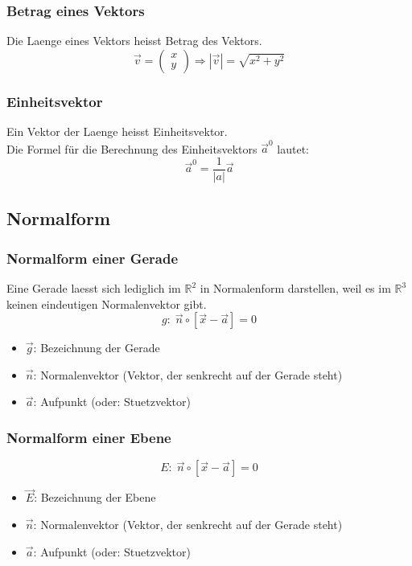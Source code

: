 \begin{multicols*}{2}
    \subsubsection{Betrag eines Vektors}
    Die Laenge eines Vektors heisst Betrag des Vektors.
    \[\vec{v}= \begin{pmatrix} x \\ y \end{pmatrix} \Longrightarrow \left|\vec{v}\right| = \sqrt{x^2 + y^2}\]
    \subsubsection{Einheitsvektor}
    Ein Vektor der Laenge heisst Einheitsvektor. \\
    Die Formel für die Berechnung des Einheitsvektors $\vec{a}^0$ lautet:
    \[\vec{a}^0 = \frac{1}{|a|} \vec{a}\]

    \subsection{Normalform}
    \subsubsection{Normalform einer Gerade}
    Eine Gerade laesst sich lediglich im $\mathbb{R}^2$ in Normalenform darstellen, weil es im $\mathbb{R}^3$ keinen eindeutigen Normalenvektor gibt.
    \[g\colon\; \vec{n} \circ [\vec{x} - \vec{a}] = 0\]

    \begin{itemize}
        \item  $\vec{g}$: Bezeichnung der Gerade
        \item  $\vec{n}$: Normalenvektor (Vektor, der senkrecht auf der Gerade steht)
        \item  $\vec{a}$: Aufpunkt (oder: Stuetzvektor)
    \end{itemize}
    \subsubsection{Normalform einer Ebene}
    \[E\colon\; \vec{n} \circ [\vec{x} - \vec{a}] = 0\]

    \begin{itemize}
        \item  $\vec{E}$: Bezeichnung der Ebene
        \item  $\vec{n}$: Normalenvektor (Vektor, der senkrecht auf der Gerade steht)
        \item  $\vec{a}$: Aufpunkt (oder: Stuetzvektor)
    \end{itemize}

\end{multicols*}
